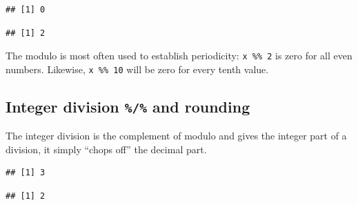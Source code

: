 \documentclass[]{book}
\newenvironment{Shaded}{\begin{snugshade}}{\end{snugshade}}
\newcommand{\DecValTok}[1]{\textcolor[rgb]{0.00,0.00,0.81}{#1}}
\newcommand{\OperatorTok}[1]{\textcolor[rgb]{0.81,0.36,0.00}{\textbf{#1}}}
\newcommand{\StringTok}[1]{\textcolor[rgb]{0.31,0.60,0.02}{#1}}
\begin{document}
\begin{Shaded}
\end{Shaded}

\begin{verbatim}
## [1] 0
\end{verbatim}

\begin{Shaded}
\end{Shaded}

\begin{verbatim}
## [1] 2
\end{verbatim}

The modulo is most often used to establish periodicity: \texttt{x\ \%\%\ 2} is zero for all even numbers. Likewise, \texttt{x\ \%\%\ 10} will be zero for every tenth value.

\hypertarget{integer-division-and-rounding}{%
\subsection{\texorpdfstring{Integer division \texttt{\%/\%} and rounding}{Integer division \%/\% and rounding}}\label{integer-division-and-rounding}}

The integer division is the complement of modulo and gives the integer part of a division, it simply ``chops off'' the decimal part.

\begin{Shaded}
\end{Shaded}

\begin{verbatim}
## [1] 3
\end{verbatim}

\begin{Shaded}
\end{Shaded}

\begin{verbatim}
## [1] 2
\end{verbatim}
\end{document}

